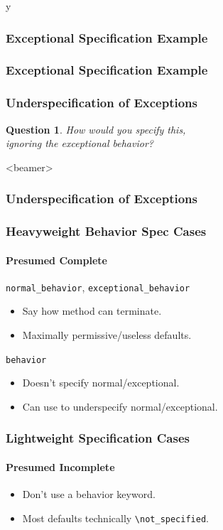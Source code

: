 \if y\MAKEHANDOUTS \documentclass[t,compress,landscape,handout]{beamer}
\newtheorem*{question}{Question}
\begin{document}
\begin{frame}[fragile]
\frametitle{Exceptional Specification Example}

\end{frame}

\begin{frame}[fragile]
\frametitle{Exceptional Specification Example}

\end{frame}

\begin{frame}
\frametitle{Underspecification of Exceptions}
\begin{question}
How would you specify this, \\
ignoring the exceptional behavior? 
\end{question}
\end{frame}

\begin{frame}<beamer>
\frametitle{Underspecification of Exceptions}

\end{frame}


\begin{frame}[fragile]
\frametitle{Heavyweight Behavior Spec Cases}
\framesubtitle{Presumed Complete}

\lstinline!normal_behavior!, \lstinline!exceptional_behavior!
\begin{itemize}
\item
Say how method can terminate.

\item
Maximally permissive/useless defaults.
\end{itemize}

\lstinline!behavior!
\begin{itemize}
\item
Doesn't specify normal/exceptional.

\item
Can use to underspecify normal/exceptional.
\end{itemize}
\end{frame}

\begin{frame}[fragile]
\frametitle{Lightweight Specification Cases}
\framesubtitle{Presumed Incomplete}

\begin{itemize}
\item
Don't use a behavior keyword.

\item
Most defaults technically \lstinline!\not_specified!.
\end{itemize}
\end{frame}
\end{document}
